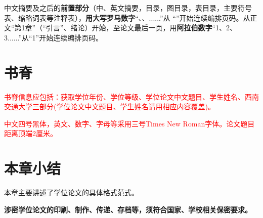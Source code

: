 中文摘要及之后的\textbf{前置部分}（中、英文摘要，目录，图目录，表目录，主要符号表、缩略词表等注释表），\textbf{用大写罗马数字}“\uppercase\expandafter{}、\uppercase\expandafter{}、\uppercase\expandafter{}......”从 “\uppercase\expandafter{}”开始连续编排页码。从正文“第1章”（“引言”、绪论）开始，至论文最后一页，用\textbf{阿拉伯数字}“1、2、3......”从“1”开始连续编排页码。

\section{书脊}

\textcolor{red}{书脊信息应包括：获取学位年份、学位等级、学位论文中文题目、学生姓名、西南交通大学三部分(学位论文中文题目、学生姓名请用相应内容覆盖)。}

\textcolor{red}{中文四号黑体，英文、数字、字母等采用三号Times New Roman字体。论文题目距离顶端2厘米。}

\section{本章小结}

本章主要讲述了学位论文的具体格式范式。

\textbf{涉密学位论文的印刷、制作、传递、存档等，须符合国家、学校相关保密要求。} 